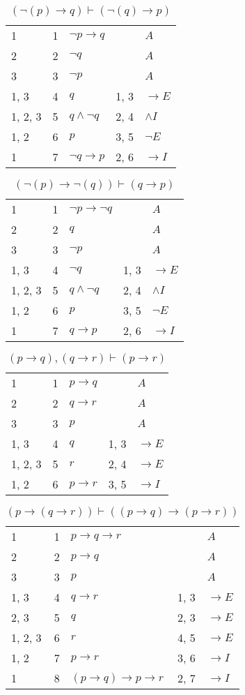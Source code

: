 \documentclass{article}
\begin{document}
\begin{table}[htbp]\caption*{$(¬(p) → q) ⊢ (¬(q) → p)$}\centering\begin{tabular}{lrlll}
{1} & 1 & $¬p→q$ & {} & $A$ \\
{2} & 2 & $¬q$ & {} & $A$ \\
{3} & 3 & $¬p$ & {} & $A$ \\
{1, 3} & 4 & $q$ & {1, 3} & $→E$ \\
{1, 2, 3} & 5 & $q∧ ¬q$ & {2, 4} & $∧I$ \\
{1, 2} & 6 & $p$ & {3, 5} & $¬E$ \\
{1} & 7 & $¬q→p$ & {2, 6} & $→I$ \\
\end{tabular}
\end{table}
\begin{table}[htbp]\caption*{$(¬(p) → ¬(q)) ⊢ (q → p)$}\centering\begin{tabular}{lrlll}
{1} & 1 & $¬p→ ¬q$ & {} & $A$ \\
{2} & 2 & $q$ & {} & $A$ \\
{3} & 3 & $¬p$ & {} & $A$ \\
{1, 3} & 4 & $¬q$ & {1, 3} & $→E$ \\
{1, 2, 3} & 5 & $q∧ ¬q$ & {2, 4} & $∧I$ \\
{1, 2} & 6 & $p$ & {3, 5} & $¬E$ \\
{1} & 7 & $q→p$ & {2, 6} & $→I$ \\
\end{tabular}
\end{table}
\begin{table}[htbp]\caption*{$(p → q),(q → r) ⊢ (p → r)$}\centering\begin{tabular}{lrlll}
{1} & 1 & $p→q$ & {} & $A$ \\
{2} & 2 & $q→r$ & {} & $A$ \\
{3} & 3 & $p$ & {} & $A$ \\
{1, 3} & 4 & $q$ & {1, 3} & $→E$ \\
{1, 2, 3} & 5 & $r$ & {2, 4} & $→E$ \\
{1, 2} & 6 & $p→r$ & {3, 5} & $→I$ \\
\end{tabular}
\end{table}
\begin{table}[htbp]\caption*{$(p → (q → r)) ⊢ ((p → q) → (p → r))$}\centering\begin{tabular}{lrlll}
{1} & 1 & $p→q→r$ & {} & $A$ \\
{2} & 2 & $p→q$ & {} & $A$ \\
{3} & 3 & $p$ & {} & $A$ \\
{1, 3} & 4 & $q→r$ & {1, 3} & $→E$ \\
{2, 3} & 5 & $q$ & {2, 3} & $→E$ \\
{1, 2, 3} & 6 & $r$ & {4, 5} & $→E$ \\
{1, 2} & 7 & $p→r$ & {3, 6} & $→I$ \\
{1} & 8 & $(p→q)→p→r$ & {2, 7} & $→I$ \\
\end{tabular}
\end{table}
\end{document}
